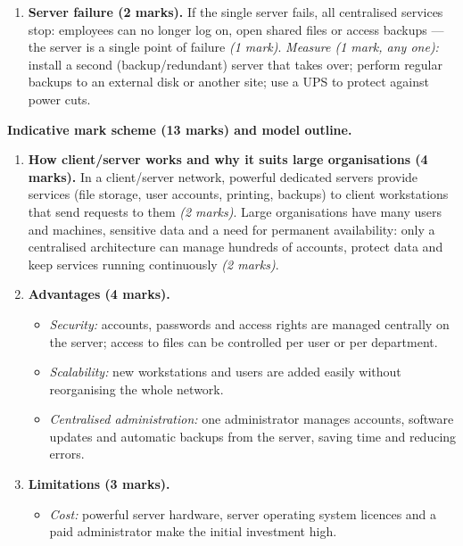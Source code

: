 \documentclass[11pt]{article}
\newcommand{\cle}[1]{{\popxbold\color{popdark}#1}}
\begin{document}
\begin{corrige}
\begin{enumerate}
\begin{itemize}
\item \emph{Security software:} server antivirus, firewall and update management.
\end{itemize}
\item \textbf{Server failure (2 marks).} If the single server fails, all centralised services stop: employees can no longer log on, open shared files or access backups — the server is a \cle{single point of failure} \emph{(1 mark)}. \emph{Measure (1 mark, any one):} install a second (backup/redundant) server that takes over; perform regular backups to an external disk or another site; use a UPS to protect against power cuts.
\end{enumerate}
\end{corrige}

\begin{corrige}
\textbf{Indicative mark scheme (13 marks) and model outline.}
\begin{enumerate}
\item \textbf{How client/server works and why it suits large organisations (4 marks).} In a \cle{client/server} network, powerful \cle{dedicated servers} provide services (file storage, user accounts, printing, backups) to \cle{client workstations} that send requests to them \emph{(2 marks)}. Large organisations have many users and machines, sensitive data and a need for permanent availability: only a centralised architecture can manage hundreds of accounts, protect data and keep services running continuously \emph{(2 marks)}.
\item \textbf{Advantages (4 marks).}
\begin{itemize}
\item \emph{Security:} accounts, passwords and access rights are managed centrally on the server; access to files can be controlled per user or per department.
\item \emph{Scalability:} new workstations and users are added easily without reorganising the whole network.
\item \emph{Centralised administration:} one administrator manages accounts, software updates and automatic backups from the server, saving time and reducing errors.
\end{itemize}
\item \textbf{Limitations (3 marks).}
\begin{itemize}
\item \emph{Cost:} powerful server hardware, server operating system licences and a paid administrator make the initial investment high.

\end{itemize}
\end{enumerate}
\end{corrige}
\end{document}
